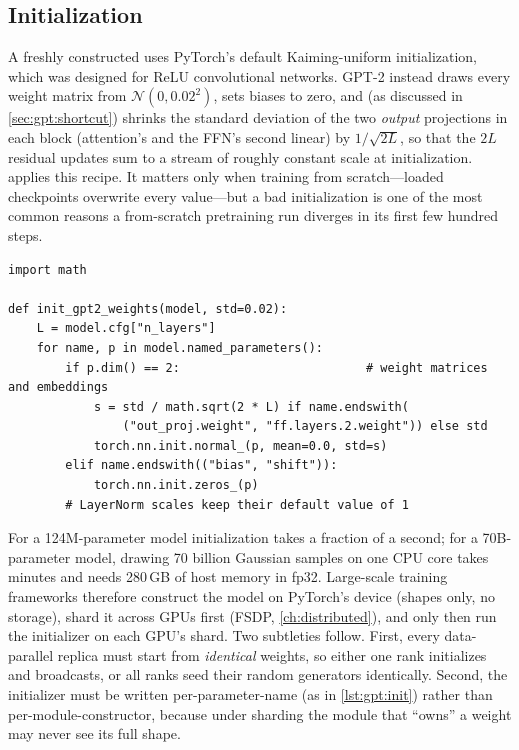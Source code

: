 \subsection{Initialization}
A freshly constructed  uses PyTorch's default Kaiming-uniform initialization, which
was designed for ReLU convolutional networks. GPT-2 instead draws every weight matrix from
$\mathcal N(0,0.02^2)$, sets biases to zero, and (as discussed in \cref{sec:gpt:shortcut}) shrinks the
standard deviation of the two \emph{output} projections in each block (attention's 
and the FFN's second linear) by $1/\sqrt{2L}$, so that the $2L$ residual updates sum to a stream of
roughly constant scale at initialization.  applies this recipe. It matters only when
training from scratch---loaded checkpoints overwrite every value---but a bad initialization is one of
the most common reasons a from-scratch pretraining run diverges in its first few hundred steps.

\begin{lstlisting}[caption={GPT-2 style initialization.},label={lst:gpt:init}]
import math

def init_gpt2_weights(model, std=0.02):
    L = model.cfg["n_layers"]
    for name, p in model.named_parameters():
        if p.dim() == 2:                          # weight matrices and embeddings
            s = std / math.sqrt(2 * L) if name.endswith(
                ("out_proj.weight", "ff.layers.2.weight")) else std
            torch.nn.init.normal_(p, mean=0.0, std=s)
        elif name.endswith(("bias", "shift")):
            torch.nn.init.zeros_(p)
        # LayerNorm scales keep their default value of 1
\end{lstlisting}

\begin{systemslens}
For a 124M-parameter model initialization takes a fraction of a second; for a 70B-parameter model,
drawing 70 billion Gaussian samples on one CPU core takes minutes and needs 280\,GB of host memory in
fp32. Large-scale training frameworks therefore construct the model on PyTorch's  device
(shapes only, no storage), shard it across GPUs first (FSDP, \cref{ch:distributed}), and only then run
the initializer on each GPU's shard. Two subtleties follow. First, every data-parallel replica must
start from \emph{identical} weights, so either one rank initializes and broadcasts, or all ranks seed
their random generators identically. Second, the initializer must be written per-parameter-name (as in
\cref{lst:gpt:init}) rather than per-module-constructor, because under sharding the module that
``owns'' a weight may never see its full shape.
\end{systemslens}

